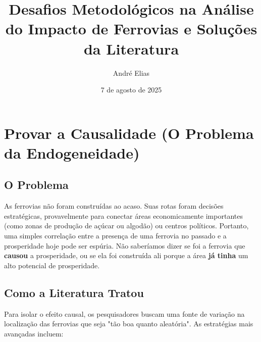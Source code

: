 \documentclass[12pt, a4paper]{article}
\title{\textbf{Desafios Metodológicos na Análise do Impacto de Ferrovias e Soluções da Literatura}}
\author{André Elias}
\date{7 de agosto de 2025}
\begin{document}
\maketitle

\section{Provar a Causalidade (O Problema da Endogeneidade)}

\subsection{O Problema}

As ferrovias não foram construídas ao acaso. Suas rotas foram decisões estratégicas, provavelmente para conectar áreas economicamente importantes (como zonas de produção de açúcar ou algodão) ou centros políticos. Portanto, uma simples correlação entre a presença de uma ferrovia no passado e a prosperidade hoje pode ser espúria. Não saberíamos dizer se foi a ferrovia que \textbf{causou} a prosperidade, ou se ela foi construída ali porque a área \textbf{já tinha} um alto potencial de prosperidade.

\subsection{Como a Literatura Tratou}

Para isolar o efeito causal, os pesquisadores buscam uma fonte de variação na localização das ferrovias que seja "tão boa quanto aleatória". As estratégias mais avançadas incluem:
\end{document}
